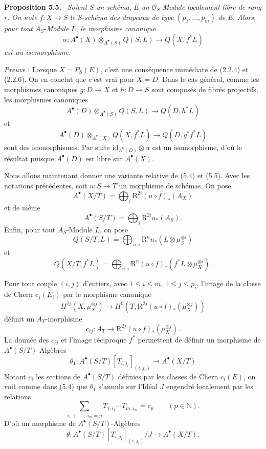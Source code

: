 \documentclass[11pt]{article}
\newenvironment{statement}[1]{\par\medskip\noindent\textbf{#1.}\ }{\par\medskip}
\begin{document}
\begin{statement}{Proposition 5.5}
\emph{Soient} $S$ \emph{un schéma}, $E$ \emph{un} $\mathcal O_S$-\emph{Module localement libre de rang} $r$. \emph{On note} $f:X\to S$ \emph{le} $S$-\emph{schéma des drapeaux de type} $(p_1,\ldots,p_m)$ \emph{de} $E$. \emph{Alors, pour tout} $A_S$-\emph{Module} $L$, \emph{le morphisme canonique}
\[
\alpha:A^\bullet(X)\otimes_{A^\bullet(S)}Q(S,L)\to Q(X,f^*L)
\]
\emph{est un isomorphisme}.
\end{statement}

\emph{Preuve} : Lorsque $X=P_S(E)$, c'est une conséquence immédiate de (2.2.4) et (2.2.6). On en conclut que c'est vrai pour $X=D$. Dans le cas général, comme les morphismes canoniques $g:D\to X$ et $h:D\to S$ sont composés de fibrés projectifs, les morphismes canoniques
\[
A^\bullet(D)\otimes_{A^\bullet(S)}Q(S,L)\to Q(D,h^*L)
\]
et
\[
A^\bullet(D)\otimes_{A^\bullet(X)}Q(X,f^*L)\to Q(D,g^*f^*L)
\]
sont des isomorphismes. Par suite $\mathrm{id}_{A^\bullet(D)}\otimes\alpha$ est un isomorphisme, d'où le résultat puisque $A^\bullet(D)$ est libre sur $A^\bullet(X)$.

Nous allons maintenant donner une variante relative de (5.4) et (5.5). Avec les notations précédentes, soit $u:S\to T$ un morphisme de schémas. On pose
\[
A^\bullet(X/T)=\bigoplus_i \mathrm{R}^{2i}(u\circ f)_*(A_X)
\]
et de même
\[
A^\bullet(S/T)=\bigoplus_i \mathrm{R}^{2i}u_*(A_S).
\]
Enfin, pour tout $A_S$-Module $L$, on pose
\[
Q(S/T,L)=\bigoplus_{n,i}\mathrm{R}^n u_*(L\otimes\mu_S^{\otimes i})
\]
et
\[
Q(X/T,f^*L)=\bigoplus_{n,i}\mathrm{R}^n(u\circ f)_*(f^*L\otimes\mu_X^{\otimes i}).
\]

Pour tout couple $(i,j)$ d'entiers, avec $1\le i\le m$, $1\le j\le p_i$, l'image de la classe de Chern $c_j(E_i)$ par le morphisme canonique
\[
H^{2j}(X,\mu_X^{\otimes j})
\to H^0(T,\mathrm{R}^{2j}(u\circ f)_*(\mu_X^{\otimes j}))
\]
définit un $A_T$-morphisme
\[
c_{ij}:A_T\to \mathrm{R}^{2j}(u\circ f)_*(\mu_X^{\otimes j}).
\]
La donnée des $c_{ij}$ et l'image réciproque $f^*$ permettent de définir un morphisme de $A^\bullet(S/T)$-Algèbres
\[
\theta_1:A^\bullet(S/T)[T_{i,j_i}]_{(i,j_i)}\to A^\bullet(X/T)
\]
Notant $c_i$ les sections de $A^\bullet(S/T)$ définies par les classes de Chern $c_i(E)$, on voit comme dans (5.4) que $\theta_1$ s'annule sur l'Idéal $J$ engendré localement par les relations
\[
\sum_{i_1+\cdots+i_m=p}T_{1,i_1}\cdots T_{m,i_m}=c_p\qquad(p\in\mathbb N).
\]
D'où un morphisme de $A^\bullet(S/T)$-Algèbres
\[
\theta:A^\bullet(S/T)[T_{i,j_i}]_{(i,j_i)}/J\to A^\bullet(X/T).
\]
\end{document}
